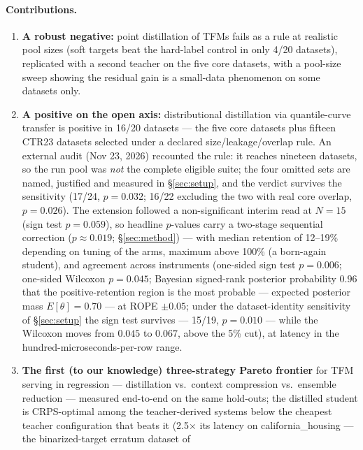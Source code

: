 \documentclass[11pt]{article}
\begin{document}
\paragraph{Contributions.}
\begin{enumerate}
  \item \textbf{A robust negative:} point distillation of TFMs fails as a
    rule at realistic pool sizes (soft targets beat the hard-label control
    in only 4/20 datasets), replicated with a second teacher on the
    five core datasets, with a pool-size sweep showing the residual
    gain is a small-data phenomenon on some datasets only.
  \item \textbf{A positive on the open axis:} distributional distillation
    via quantile-curve transfer is positive in 16/20 datasets --- the
    five core datasets plus fifteen CTR23 datasets selected under a
    declared size/leakage/overlap rule. An external audit (Nov 23,
    2026) recounted the rule: it reaches nineteen datasets, so the run
    pool was \emph{not} the complete eligible suite; the four omitted
    sets are named, justified and measured in \S\ref{sec:setup}, and
    the verdict survives the sensitivity (17/24, $p=0.032$; 16/22
    excluding the two with real core overlap, $p=0.026$). The
    extension followed a non-significant interim read at
    $N{=}15$ (sign test $p = 0.059$), so headline $p$-values carry a
    two-stage sequential correction ($p \approx 0.019$; \S\ref{sec:method}) ---
    with median retention of 12--19\% depending on tuning of the
    arms, maximum above 100\% (a born-again student),
    and agreement across instruments (one-sided sign test $p = 0.006$;
    one-sided Wilcoxon
    $p = 0.045$; Bayesian signed-rank posterior probability $0.96$
    that the positive-retention region is the most probable ---
    expected posterior mass $E[\theta] = 0.70$ --- at
    ROPE $\pm 0.05$; under the dataset-identity sensitivity of
    \S\ref{sec:setup} the sign test survives --- 15/19, $p = 0.010$ ---
    while the Wilcoxon moves from $0.045$ to $0.067$, above the 5\%
    cut), at latency in the hundred-microseconds-per-row range.
  \item \textbf{The first (to our knowledge) three-strategy Pareto
    frontier} for TFM serving
    in regression --- distillation vs.\ context compression vs.\ ensemble
    reduction --- measured end-to-end on the same hold-outs; the
    distilled student is CRPS-optimal among the teacher-derived
    systems below the cheapest teacher
    configuration that beats it (2.5$\times$ its latency on
    california\_housing --- the binarized-target erratum dataset of

\end{enumerate}
\end{document}
